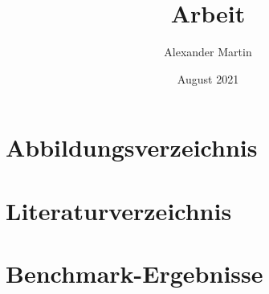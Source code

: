 \documentclass[11pt,titlepage]{report}
\title{Arbeit}
\author{Alexander Martin}
\date{August 2021}
\newcommand\blankpage{
    \null
    \thispagestyle{empty}
    \addtocounter{page}{-1}
    \newpage
}
\begin{document}
\let\origdoublepage\cleardoublepage
\newcommand{\clearemptydoublepage}{%
  \clearpage
  {\pagestyle{empty}\origdoublepage}%
}

\pagestyle{empty}

\afterpage{\blankpage}

\afterpage{\blankpage}

\let\cleardoublepage\clearemptydoublepage

\fancyhead{} %
\fancyhead[RO,LE]{\leftmark}
\setlength{\headheight}{15pt}
\pagestyle{fancy}
\tableofcontents








\chapter{Abbildungsverzeichnis}
\listoffigures

\chapter{Literaturverzeichnis}
\printbibliography

\appendix
\chapter{Benchmark-Ergebnisse}

\end{document}
